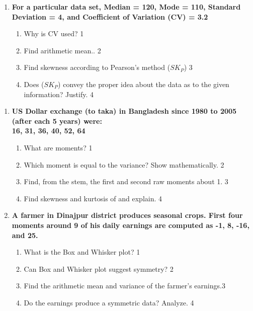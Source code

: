 \documentclass[a4paper,oneside]{book}
\begin{document}
\begin{enumerate}
 \item
	  \textbf{For a particular data set, Median = 120, Mode = 110, Standard Deviation = 4, and Coefficient of Variation (CV)  = 3.2} 
  
  \begin{enumerate}
    \item
	Why is  CV used?  \hfill 1
    \item
	Find arithmetic mean.. \hfill 2
    \item  
	Find skewness according to Pearson's method ($SK_P$) \hfill 3
    \item
	Does ($SK_P$) convey the proper idea about the data as to the given information? Justify. \hfill 4
  \end{enumerate}
  \end{enumerate}

  \begin{enumerate}
 \item
	  \textbf{US Dollar exchange (to taka) in Bangladesh since 1980 to 2005 (after each 5 years) were: \\ 16, 31, 36, 40, 52, 64} 
  
  \begin{enumerate}
    \item
	What are moments? \hfill 1
    \item
	Which moment is equal to the variance? Show mathematically. \hfill 2
    \item  
	Find, from the stem, the first and second raw moments about 1. \hfill 3
    \item
	Find skewness and kurtosis of and explain. \hfill 4
\end{enumerate}

 \item
	  \textbf{A farmer in Dinajpur district produces seasonal crops. First four moments around 9 of his daily earnings are computed as -1, 8, -16, and 25.}
  
  \begin{enumerate}
    \item
	What is the Box and Whisker plot? \hfill 1
    \item
	Can Box and Whisker plot suggest symmetry? \hfill 2
    \item  
	 Find the arithmetic mean and variance of the farmer's earnings.\hfill 3
    \item
	Do the earnings produce a symmetric data? Analyze. \hfill 4
  \end{enumerate}


\end{enumerate}
\end{document}
